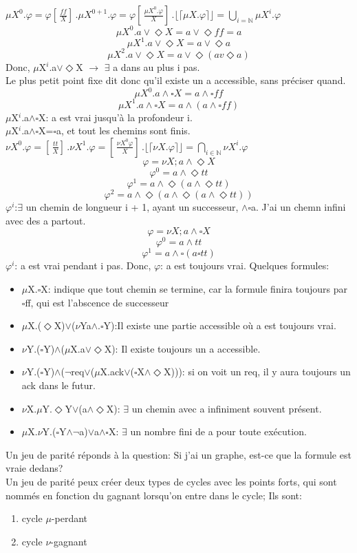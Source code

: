 $\mu X^0.\varphi =\varphi[ \,\frac{ff}{X}] \,$.$\mu X^{0+1}.\varphi =\varphi[ \,\frac{\mu X^0.\varphi}{X}] \,$.$\lfloor\lceil\mu X.\varphi\rceil\rfloor =\bigcup_{i=\mathbb{N}}\mu X^i.\varphi$
\medskip
$$\mu X^0.a\vee\Diamond X=a\vee\Diamond ff=a$$
$$\mu X^1.a\vee\Diamond X=a\vee\Diamond a$$
$$\mu X^2.a\vee\Diamond X=a\vee\Diamond(av\Diamond a)$$
Donc, $\mu$X$^i$.a$\vee\Diamond$X $\rightarrow$ $\exists$ a dans au plus i pas.\\
Le plus petit point fixe dit donc qu'il existe un a accessible, sans pr\'eciser quand.
$$\mu X^0.a\wedge\square X=a\wedge\square ff$$
$$\mu X^1.a\wedge\square X=a\wedge(a\wedge\square ff)$$
$\mu$X$^i$.a$\wedge\square$X: a est vrai jusqu'\`a la profondeur i.\\
$\mu$X$^i$.a$\wedge\square$X=$\square$a, et tout les chemins sont finis.\\
$\nu X^0.\varphi=[ \,\frac{tt}{X}] \,$.$\nu X^1.\varphi=[ \,\frac{\nu X^0\varphi}{X}] \,$.$\lfloor\lceil\nu
X.\varphi\rceil\rfloor=\bigcap_{i\in\mathbb{N}}\nu X^i.\varphi$
$$\varphi=\nu X;a\wedge\Diamond X$$
$$\varphi^0=a\wedge\Diamond tt$$
$$\varphi^1=a\wedge\Diamond(a\wedge\Diamond tt)$$
$$\varphi^2=a\wedge\Diamond(a\wedge\Diamond(a\wedge\Diamond tt))$$
$\varphi^i$:$\exists$ un chemin de longueur i + 1, ayant un successeur, $\wedge\square$a.
J'ai un chemn infini avec des a partout.
\medskip
$$\varphi=\nu X;a\wedge\square X$$
$$\varphi^0=a\wedge tt$$
$$\varphi^1= a\wedge\square(a\square tt)$$
$\varphi^i$: a est vrai pendant i pas.
Donc, $\varphi$: a est toujours vrai.
\medskip
Quelques formules:
\begin{itemize}
  \item $\mu$X.$\square$X: indique que tout chemin se termine, car la formule finira toujours par $\square$ff, qui est
  l'abscence de successeur
  \item $\mu$X.($\Diamond$X)$\vee$($\nu$Ya$\wedge$.$\square$Y):Il existe une partie accessible o\`u a est toujours
  vrai.
  \item $\nu$Y.($\square$Y)$\wedge$($\mu$X.a$\vee\Diamond$X): Il existe toujours un a accessible.
  \item
  $\nu$Y.($\square$Y)$\wedge$($\neg$req$\vee$($\mu$X.ack$\vee$($\square$X$\wedge\Diamond$X))):
  si on voit un req, il y aura toujours un ack dans le futur.
  \item $\nu$X.$\mu$Y.$\Diamond$Y$\vee$(a$\wedge\Diamond$X): $\exists$ un chemin avec a infiniment souvent
  pr\'esent.
  \item $\mu$X.$\nu$Y.($\square$Y$\wedge\neg$a)$\vee$a$\wedge\square$X: $\exists$ un nombre fini de a pour toute
  ex\'ecution.
\end{itemize}
\medskip
Un jeu de parit\'e r\'eponds \`a la question: Si j'ai un graphe, est-ce que la formule est vraie dedans?\\
Un jeu de parit\'e peux cr\'eer deux types de cycles avec les points forts, qui sont nomm\'es en fonction du gagnant
lorsqu'on entre dans le cycle; Ils sont:
\begin{enumerate}
  \item cycle $\mu$-perdant
  \item cycle $\nu$-gagnant
\end{enumerate}
